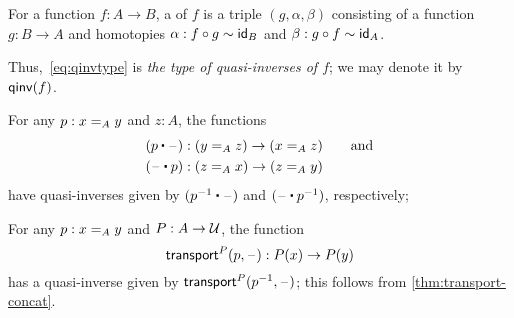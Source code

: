 \documentclass[hott-all.tex]{subfiles}
\begin{document}
\begin{defn}\label{defn:quasi-inverse}
  For a function $f:A\to B$, a 
  of $f$ is a triple $(g,\alpha,\beta)$ consisting of a function $g:B\to A$ and homotopies
$\alpha:f\circ g\htpy \idfunc[B]$ and $\beta:g\circ f\htpy \idfunc[A]$.
\end{defn}

Thus,~\eqref{eq:qinvtype} is \emph{the type of quasi-inverses of $f$}; we may denote it by $\qinv(f)$.


\begin{eg}\label{eg:concatequiv}
  For any $p:\id[A]xy$ and $z:A$, the functions
  \begin{align*}
    (p\ct \blank)&:(\id[A]yz) \to (\id[A]xz) \qquad\text{and}\\
    (\blank \ct p)&:(\id[A]zx) \to (\id[A]zy)
  \end{align*}
  have quasi-inverses given by $(\opp p \ct \blank)$ and $(\blank \ct \opp p)$, respectively; %
\end{eg}

\begin{eg}\label{thm:transportequiv}
  For any $p:\id[A]xy$ and $P:A\to\type$, the function
  \[\transfib{P}{p}{\blank}:P(x) \to P(y)\]
  has a quasi-inverse given by $\transfib{P}{\opp p}{\blank}$; this follows from \narrowbreak \cref{thm:transport-concat}.
\end{eg}
\end{document}
